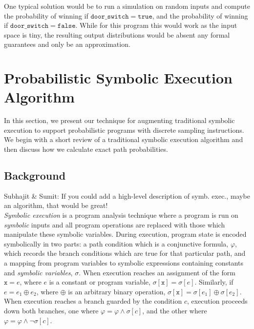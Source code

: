 \documentclass[acmsmall,review]{acmart}\settopmatter{}
\begin{document}
	
	One typical solution would be to run a simulation on random inputs and compute the probability of winning if $\mathtt{door\_switch} = \mathtt{true}$, and the probability of winning if $\mathtt{door\_switch} = \mathtt{false}$.
	While for this program this would work as the input space is tiny, the resulting output distributions would be absent any formal guarantees and only be an approximation.
	
	
	\section{Probabilistic Symbolic Execution Algorithm}
	\label{sec:pse}
	In this section, we present our technique for augmenting traditional symbolic execution to support probabilistic programs with discrete sampling instructions. 
	We begin with a short review of a traditional symbolic execution algorithm and then discuss how we calculate exact path probabilities.
	
	\subsection{Background}
	\label{sec:trad_sym_exec}
	{\color{red} Subhajit \& Sumit: If you could add a high-level description of symb. exec., maybe an algorithm, that would be great!\\}
	\textit{Symbolic execution} is a program analysis technique where a program is run on \textit{symbolic} inputs and all program operations are replaced with those which manipulate these symbolic variables.
	During execution, program state is encoded symbolically in two parts: a path condition which is a conjunctive formula, $\varphi$, which records the branch conditions which are true for that particular path, and a mapping from program variables to symbolic expressions containing constants and \textit{symbolic variables}, $\sigma$.
	When execution reaches an assignment of the form $\mathtt{x} = e$, where $e$ is a constant or program variable, $\sigma[\mathtt{x}] = \sigma[e]$.
	Similarly, if $e = e_1 \oplus e_2$, where $\oplus$ is an arbitrary binary operation, $\sigma[\mathtt{x}] = \sigma[e_1] \oplus \sigma[e_2]$. 
	When execution reaches a branch guarded by the condition $c$, execution proceeds down both branches, one where $\varphi = \varphi \wedge \sigma[c]$, and the other where $\varphi = \varphi \wedge \neg \sigma[c]$. 
	
\end{document}
